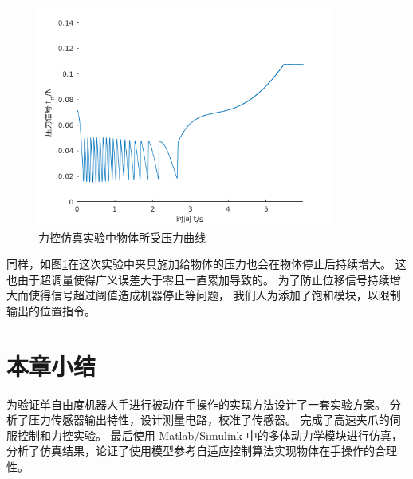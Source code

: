 \begin{figure}[!ht]
  \centering
  \includegraphics[width=9.7cm]{chapter04/pic/fn_x}
  \caption{\label{fig:fn_x}
    力控仿真实验中物体所受压力曲线}
  \vspace{-0.3cm}
\end{figure}


同样，如图\ref{fig:fn_x}在这次实验中夹具施加给物体的压力也会在物体停止后持续增大。
这也由于超调量使得广义误差大于零且一直累加导致的。
为了防止位移信号持续增大而使得信号超过阈值造成机器停止等问题，
我们人为添加了饱和模块，以限制输出的位置指令。


\section{本章小结}
为验证单自由度机器人手进行被动在手操作的实现方法设计了一套实验方案。
分析了压力传感器输出特性，设计测量电路，校准了传感器。
完成了高速夹爪的伺服控制和力控实验。
最后使用 Matlab/Simulink 中的多体动力学模块进行仿真，
分析了仿真结果，论证了使用模型参考自适应控制算法实现物体在手操作的合理性。

